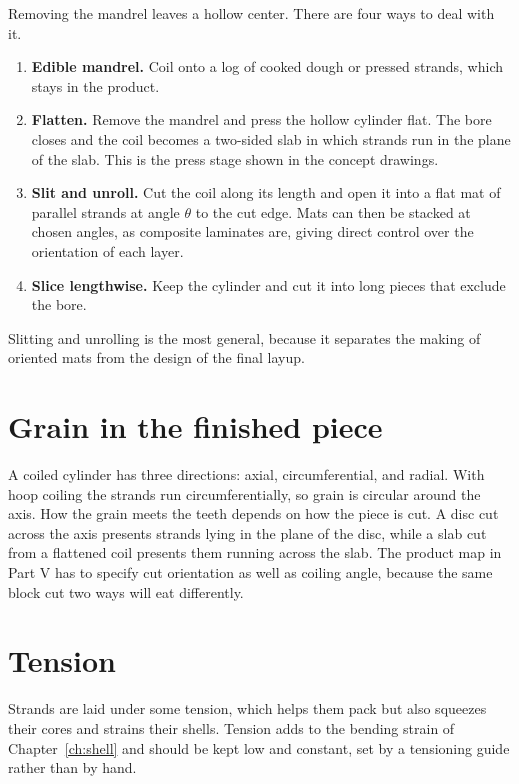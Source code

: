 \documentclass[11pt,openany]{book}
\theoremstyle{definition}
\begin{document}
Removing the mandrel leaves a hollow center. There are four ways to deal with it.

\begin{enumerate}
\item \textbf{Edible mandrel.} Coil onto a log of cooked dough or pressed strands, which stays in the product.
\item \textbf{Flatten.} Remove the mandrel and press the hollow cylinder flat. The bore closes and the coil becomes a two-sided slab in which strands run in the plane of the slab. This is the press stage shown in the concept drawings.
\item \textbf{Slit and unroll.} Cut the coil along its length and open it into a flat mat of parallel strands at angle $\theta$ to the cut edge. Mats can then be stacked at chosen angles, as composite laminates are, giving direct control over the orientation of each layer.
\item \textbf{Slice lengthwise.} Keep the cylinder and cut it into long pieces that exclude the bore.
\end{enumerate}

Slitting and unrolling is the most general, because it separates the making of oriented mats from the design of the final layup.

\section{Grain in the finished piece}

A coiled cylinder has three directions: axial, circumferential, and radial. With hoop coiling the strands run circumferentially, so grain is circular around the axis. How the grain meets the teeth depends on how the piece is cut. A disc cut across the axis presents strands lying in the plane of the disc, while a slab cut from a flattened coil presents them running across the slab. The product map in Part V has to specify cut orientation as well as coiling angle, because the same block cut two ways will eat differently.

\section{Tension}

Strands are laid under some tension, which helps them pack but also squeezes their cores and strains their shells. Tension adds to the bending strain of Chapter~\ref{ch:shell} and should be kept low and constant, set by a tensioning guide rather than by hand.
\end{document}
